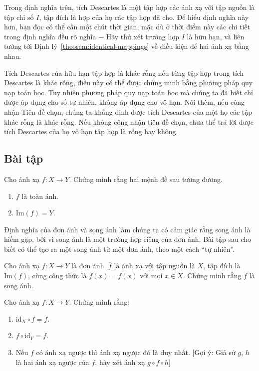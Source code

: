 Trong định nghĩa trên, tích Descartes là một tập hợp các ánh xạ với tập nguồn là tập chỉ số $I$, tập đích là hợp của họ các tập hợp đã cho. Để hiểu định nghĩa này hơn, bạn đọc có thể cần một chút thời gian, mặc dù ở thời điểm này các chi tiết trong định nghĩa đều rõ nghĩa $-$ Hãy thử xét trường hợp $I$ là hữu hạn, và liên tưởng tới Định lý~\ref{theorem:identical-mappings} về điều kiện để hai ánh xạ bằng nhau.

Tích Descartes của hữu hạn tập hợp là khác rỗng nếu từng tập hợp trong tích Descartes là khác rỗng, điều này có thể được chứng minh bằng phương pháp quy nạp toán học. Tuy nhiên phương pháp quy nạp toán học mà chúng ta đã biết chỉ được áp dụng cho số tự nhiên, không áp dụng cho vô hạn. Nói thêm, nếu công nhận Tiên đề chọn, chúng ta khẳng định được tích Descartes của một họ các tập khác rỗng là khác rỗng. Nếu không công nhận tiên đề chọn, chưa thể trả lời được tích Descartes của họ vô hạn tập hợp là rỗng hay không.

\subsection{Bài tập}
\setcounter{exercise}{0}

\begin{exercise}
    Cho ánh xạ $f: X\to Y$. Chứng minh rằng hai mệnh đề sau tương đương.
    \begin{enumerate}[label={(\roman*)},itemsep=0pt]
        \item $f$ là toàn ánh.
        \item $\text{Im}(f) = Y$.
    \end{enumerate}
\end{exercise}

Định nghĩa của đơn ánh và song ánh làm chúng ta có cảm giác rằng song ánh là hiếm gặp, bởi vì song ánh là một trường hợp riêng của đơn ánh. Bài tập sau cho biết có thể tạo ra một song ánh từ một đơn ánh, theo một cách ``tự nhiên''.

\begin{exercise}
    Cho ánh xạ $f: X\to Y$ là đơn ánh. $\overline{f}$ là ánh xạ với tập nguồn là $X$, tập đích là $\text{Im}(f)$, cùng công thức là $\overline{f}(x) = f(x)$ với mọi $x\in X$. Chứng minh rằng $\overline{f}$ là song ánh.
\end{exercise}

\begin{exercise}
    Cho ánh xạ $f: X\to Y$. Chứng minh rằng:
    \begin{enumerate}[label={(\roman*)}]
        \item $\text{id}_{X} \circ f = f$.
        \item $f \circ \text{id}_{Y} = f$.
        \item Nếu $f$ có ánh xạ ngược thì ánh xạ ngược đó là duy nhất. [Gợi ý: Giả sử $g$, $h$ là hai ánh xạ ngược của $f$, hãy xét ánh xạ $g\circ f\circ h$]
    \end{enumerate}
\end{exercise}

